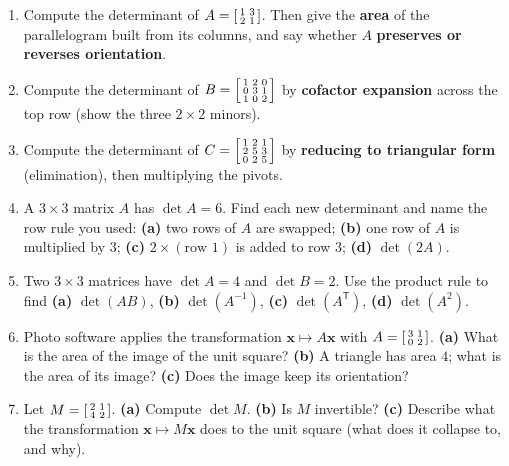 \documentclass[10pt]{article}
\newcommand{\xx}{\mathbf{x}}
\newcommand{\T}{^{\mathsf T}}
\begin{document}
\begin{enumerate}[leftmargin=1.9em, itemsep=12pt]
  \item Compute the determinant of $A=\begin{bsmallmatrix}1&3\\2&1\end{bsmallmatrix}$. Then give the
        \textbf{area} of the parallelogram built from its columns, and say whether $A$
        \textbf{preserves or reverses orientation}.
        \vspace{1.8cm}
  \item Compute the determinant of $B=\begin{bsmallmatrix}1&2&0\\0&3&1\\1&0&2\end{bsmallmatrix}$ by
        \textbf{cofactor expansion} across the top row (show the three $2\times2$ minors).
        \vspace{2.6cm}
  \item Compute the determinant of $C=\begin{bsmallmatrix}1&2&1\\2&5&3\\0&2&5\end{bsmallmatrix}$ by
        \textbf{reducing to triangular form} (elimination), then multiplying the pivots.
        \vspace{2.8cm}
  \item A $3\times3$ matrix $A$ has $\det A=6$. Find each new determinant and name the row rule you used:
        \textbf{(a)} two rows of $A$ are swapped; \textbf{(b)} one row of $A$ is multiplied by $3$;
        \textbf{(c)} $2\times(\text{row }1)$ is added to row $3$; \textbf{(d)} $\det(2A)$.
        \vspace{2.6cm}
  \item Two $3\times3$ matrices have $\det A=4$ and $\det B=2$. Use the product rule to find
        \textbf{(a)} $\det(AB)$, \textbf{(b)} $\det(A^{-1})$, \textbf{(c)} $\det(A\T)$, \textbf{(d)} $\det(A^2)$.
        \vspace{2.4cm}
  \item Photo software applies the transformation $\xx\mapsto A\xx$ with $A=\begin{bsmallmatrix}3&1\\0&2\end{bsmallmatrix}$.
        \textbf{(a)} What is the area of the image of the unit square? \textbf{(b)} A triangle has area $4$;
        what is the area of its image? \textbf{(c)} Does the image keep its orientation?
        \vspace{2.4cm}
  \item Let $M=\begin{bsmallmatrix}2&1\\4&2\end{bsmallmatrix}$. \textbf{(a)} Compute $\det M$.
        \textbf{(b)} Is $M$ invertible? \textbf{(c)} Describe what the transformation $\xx\mapsto M\xx$ does
        to the unit square (what does it collapse to, and why).
        \vspace{2.4cm}
\end{enumerate}
\end{document}
